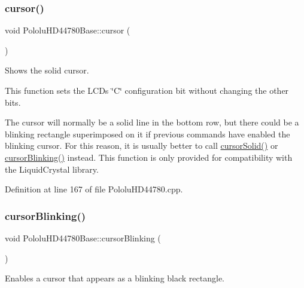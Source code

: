 \mbox{\label{class_pololu_h_d44780_base_a4fd53028d74561be579103d674aa8eab}} 
\subsubsection{\texorpdfstring{cursor()}{cursor()}}
{\footnotesize\ttfamily void Pololu\+H\+D44780\+Base\+::cursor (\begin{DoxyParamCaption}{ }\end{DoxyParamCaption})\hspace{0.3cm}{\ttfamily [inherited]}}

Shows the solid cursor.

This function sets the L\+CD\textquotesingle{}s \char`\"{}\+C\char`\"{} configuration bit without changing the other bits.

The cursor will normally be a solid line in the bottom row, but there could be a blinking rectangle superimposed on it if previous commands have enabled the blinking cursor. For this reason, it is usually better to call \hyperlink{class_pololu_h_d44780_base_a6a4d8e79beda9f7c81659a8e13c8c338}{cursor\+Solid()} or \hyperlink{class_pololu_h_d44780_base_a6a53a6cffbb77953b5a2c4ae49e288de}{cursor\+Blinking()} instead. This function is only provided for compatibility with the Liquid\+Crystal library. 

Definition at line 167 of file Pololu\+H\+D44780.\+cpp.

\mbox{\label{class_pololu_h_d44780_base_a6a53a6cffbb77953b5a2c4ae49e288de}} 
\subsubsection{\texorpdfstring{cursor\+Blinking()}{cursorBlinking()}}
{\footnotesize\ttfamily void Pololu\+H\+D44780\+Base\+::cursor\+Blinking (\begin{DoxyParamCaption}{ }\end{DoxyParamCaption})\hspace{0.3cm}{\ttfamily [inherited]}}

Enables a cursor that appears as a blinking black rectangle.

